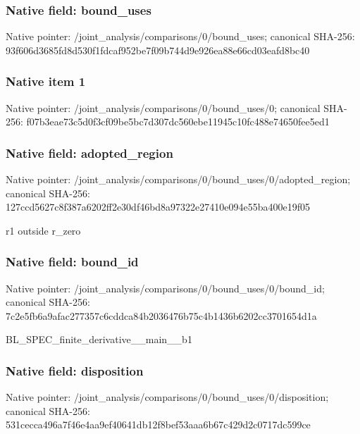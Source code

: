 \documentclass[10pt,a4paper]{article}
\begin{document}
\subsubsection{Native field: bound\_\allowbreak{}uses}
Native pointer: /joint\_\allowbreak{}analysis/comparisons/0/bound\_\allowbreak{}uses; canonical SHA-256: 93f606d3685fd8d530f1fdcaf952be7f09b744d9e926ea88e66cd03eafd8bc40

\subsubsection{Native item 1}
Native pointer: /joint\_\allowbreak{}analysis/comparisons/0/bound\_\allowbreak{}uses/0; canonical SHA-256: f07b3eae73c5d0f3cf09be5bc7d307dc560ebe11945c10fc488e74650fee5ed1

\subsubsection{Native field: adopted\_\allowbreak{}region}
Native pointer: /joint\_\allowbreak{}analysis/comparisons/0/bound\_\allowbreak{}uses/0/adopted\_\allowbreak{}region; canonical SHA-256: 127ccd5627c8f387a6202ff2e30df46bd8a97322e27410e094e55ba400e19f05

\begingroup\raggedright\sloppy r1 outside r\_\allowbreak{}zero\par\endgroup

\subsubsection{Native field: bound\_\allowbreak{}id}
Native pointer: /joint\_\allowbreak{}analysis/comparisons/0/bound\_\allowbreak{}uses/0/bound\_\allowbreak{}id; canonical SHA-256: 7c2e5fb6a9afac277357c6cddca84b2036476b75c4b1436b6202cc3701654d1a

\begingroup\raggedright\sloppy BL\_\allowbreak{}SPEC\_\allowbreak{}finite\_\allowbreak{}derivative\_\allowbreak{}\_\allowbreak{}main\_\allowbreak{}\_\allowbreak{}b1\par\endgroup

\subsubsection{Native field: disposition}
Native pointer: /joint\_\allowbreak{}analysis/comparisons/0/bound\_\allowbreak{}uses/0/disposition; canonical SHA-256: 531cecca496a7f46e4aa9ef40641db12f8bef53aaa6b67c429d2c0717dc599ce
\end{document}
